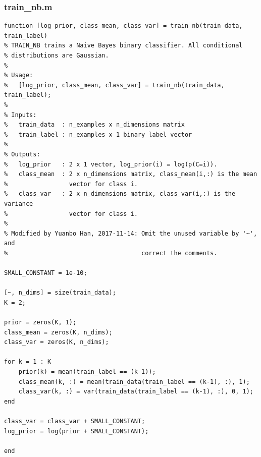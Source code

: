 \documentclass{article}
\begin{document}
\subsubsection{train\_nb.m}
\begin{lstlisting}
function [log_prior, class_mean, class_var] = train_nb(train_data, train_label)
% TRAIN_NB trains a Naive Bayes binary classifier. All conditional
% distributions are Gaussian.
%
% Usage:
%   [log_prior, class_mean, class_var] = train_nb(train_data, train_label);
%
% Inputs:
%   train_data  : n_examples x n_dimensions matrix
%   train_label : n_examples x 1 binary label vector
%
% Outputs:
%   log_prior   : 2 x 1 vector, log_prior(i) = log(p(C=i)).
%   class_mean  : 2 x n_dimensions matrix, class_mean(i,:) is the mean
%                 vector for class i.
%   class_var   : 2 x n_dimensions matrix, class_var(i,:) is the variance
%                 vector for class i.
%
% Modified by Yuanbo Han, 2017-11-14: Omit the unused variable by '~', and
%                                     correct the comments.

SMALL_CONSTANT = 1e-10;

[~, n_dims] = size(train_data);
K = 2;

prior = zeros(K, 1);
class_mean = zeros(K, n_dims);
class_var = zeros(K, n_dims);

for k = 1 : K
    prior(k) = mean(train_label == (k-1));
    class_mean(k, :) = mean(train_data(train_label == (k-1), :), 1);
    class_var(k, :) = var(train_data(train_label == (k-1), :), 0, 1);
end

class_var = class_var + SMALL_CONSTANT;
log_prior = log(prior + SMALL_CONSTANT);

end
\end{lstlisting}
\end{document}
